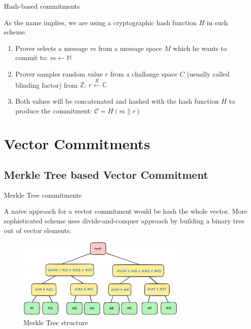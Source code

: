 \documentclass[xcolor={usenames,dvipsnames}]{beamer}
\begin{document}
    \begin{frame}{Hash-based commitments}

        As the name implies, we are using a cryptographic hash function \(H\) in such scheme.

        \begin{definition}
            \begin{enumerate}
                \item Prover selects a message $m$ from a message space $M$ which he wants to commit to:
                    $m \leftarrow \mathbb{M}$
            
                \item Prover samples random value $r$ from a challange space $C$ (usually called blinding factor) from $\mathbb{Z}$:
                    $r \xleftarrow{R} \mathbb{C}$
                
                \item Both values will be concatenated and hashed with the hash function $H$ to produce the commitment:
                    $\mathcal{C} = H(m \parallel r)$
            \end{enumerate}
        \end{definition}

    \end{frame}

    \section{Vector Commitments}

    \subsection{Merkle Tree based Vector Commitment}

    \begin{frame}{Merkle Tree commitments}

        A naive approach for a vector commitment would be hash the whole vector. 
        More sophisticated scheme uses divide-and-conquer approach by building a binary tree out of vector elements.

        \begin{figure}
            \centering
            \includegraphics[width=0.75\textwidth]{images/lecture_5/MerkleTree.png}
            \caption{Merkle Tree structure}
        \end{figure}

    \end{frame}
\end{document}
